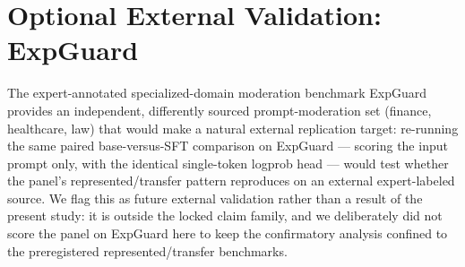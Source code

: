 \documentclass[sigconf,nonacm]{acmart}
\begin{document}
\section{Optional External Validation: ExpGuard}
\label{app:external}

The expert-annotated specialized-domain moderation benchmark ExpGuard \cite{expguard2026} provides an independent, differently sourced prompt-moderation set (finance, healthcare, law) that would make a natural external replication target: re-running the same paired base-versus-SFT comparison on ExpGuard --- scoring the input prompt only, with the identical single-token logprob head --- would test whether the panel's represented/transfer pattern reproduces on an external expert-labeled source. We flag this as future external validation rather than a result of the present study: it is outside the locked claim family, and we deliberately did not score the panel on ExpGuard here to keep the confirmatory analysis confined to the preregistered represented/transfer benchmarks.



\end{document}
